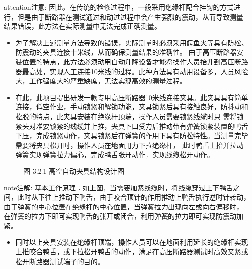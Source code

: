 \documentclass[a4paper,10pt,english]{sphinxmanual}
\begin{document}
\begin{sphinxadmonition}{attention}{注意:}
\sphinxAtStartPar
因此，在传统的检修过程中，一般采用绝缘杆配合挂钩的方式进行，但是由于断路器在测试通过和动过过程中会产生强烈的震动，从而导致测量
结果错误，此方法在实际测量中无法完成正确测量。
\end{sphinxadmonition}
\begin{itemize}
\item {} 
\sphinxAtStartPar
为了解决上述测量方法导致的错误，实际测量时必须采用鳄鱼夹等具有防松、防震动的夹具连接十米线，从而确保测量结果的准确性。
由于高压断路器安装位置的特点，此方法必须动用自动升降设备才能将操作人员抬升到高压断路器最高处，实现人工连接10米线的过程。此种方法具有动用设备多，人员风险大，工作强度大的严重缺席，无法实现高效的测量过程。

\item {} 
\sphinxAtStartPar
在此，此项目提出研发一款专用高压断路器10米线连接夹具。此夹具具有简单连接，低空作业，手动锁紧和解锁功能，夹具锁紧后具有接触良好，防抖动和松脱的特点，此夹具安装在绝缘杆顶端，操作人员需要锁紧线缆时只
需将锁紧头对准要锁紧的线缆并上推，夹具下口受力后推动带有弹簧锁紧装置的鸭舌下压，完成锁紧动作，夹具锁紧后在弹簧的作用下具有防松特性。当测量完毕需要将夹具松开时，操作人员在地面用力下拉绝缘杆，
此时鸭舌上抬并拉动弹簧实现弹簧拉力偏心，完成鸭舌张开动作，实现线缆松开动作。

\end{itemize}

\begin{figure}[htbp]
\centering
\capstart

\noindent{}
\caption{图 3.2.1 高空自动夹具结构设计图}\label{\detokenize{work_principle:id6}}\end{figure}

\begin{sphinxadmonition}{note}{注解:}
\sphinxAtStartPar
基本工作原理：如上图，当需要加紧线缆时，将线缆穿过上下鸭舌之间，此时从下往上推动下鸭舌，由于咬合顶针的作用推动上鸭舌执行逆时针转动，由于弹簧的中心位置在绝缘杆的中心位置，当弹簧拉力出现向左或向右偏移时，
在弹簧的拉力下即可实现鸭舌的张开或闭合，利用弹簧的拉力即可实现防震动加紧。
\end{sphinxadmonition}
\begin{itemize}
\item {} 
\sphinxAtStartPar
同时以上夹具安装在绝缘杆顶端，操作人员可以在地面利用延长的绝缘杆实现上推咬合鸭舌，或下拉松开鸭舌的动作，满足在高压断路器测试时高效夹紧或松开断路器测试端子的目的。

\end{itemize}
\end{document}
